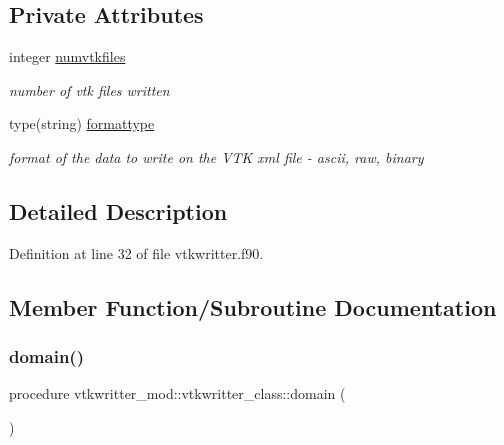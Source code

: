 \subsection*{Private Attributes}
\begin{DoxyCompactItemize}
\item 
integer \mbox{\hyperlink{structvtkwritter__mod_1_1vtkwritter__class_a31a432e4d44ff478500f0f95bb8582d2}{numvtkfiles}}
\begin{DoxyCompactList}\small\item\em number of vtk files written \end{DoxyCompactList}\item 
type(string) \mbox{\hyperlink{structvtkwritter__mod_1_1vtkwritter__class_a1488d11c6ab4adaf97a2eac301bab694}{formattype}}
\begin{DoxyCompactList}\small\item\em format of the data to write on the V\+TK xml file -\/ ascii, raw, binary \end{DoxyCompactList}\end{DoxyCompactItemize}


\subsection{Detailed Description}


Definition at line 32 of file vtkwritter.\+f90.



\subsection{Member Function/\+Subroutine Documentation}
\mbox{\label{structvtkwritter__mod_1_1vtkwritter__class_a7abd7831d763c178e15bd8b6fb7e358e}} 
\subsubsection{\texorpdfstring{domain()}{domain()}}
{\footnotesize\ttfamily procedure vtkwritter\+\_\+mod\+::vtkwritter\+\_\+class\+::domain (\begin{DoxyParamCaption}{ }\end{DoxyParamCaption})\hspace{0.3cm}{\ttfamily [private]}}



